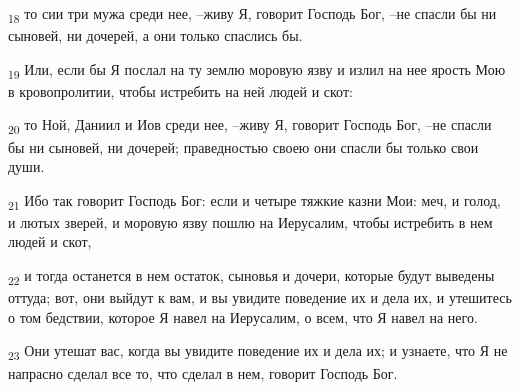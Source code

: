 \begin{tcolorbox}
\textsubscript{18} то сии три мужа среди нее, --живу Я, говорит Господь Бог, --не спасли бы ни сыновей, ни дочерей, а они только спаслись бы.
\end{tcolorbox}
\begin{tcolorbox}
\textsubscript{19} Или, если бы Я послал на ту землю моровую язву и излил на нее ярость Мою в кровопролитии, чтобы истребить на ней людей и скот:
\end{tcolorbox}
\begin{tcolorbox}
\textsubscript{20} то Ной, Даниил и Иов среди нее, --живу Я, говорит Господь Бог, --не спасли бы ни сыновей, ни дочерей; праведностью своею они спасли бы только свои души.
\end{tcolorbox}
\begin{tcolorbox}
\textsubscript{21} Ибо так говорит Господь Бог: если и четыре тяжкие казни Мои: меч, и голод, и лютых зверей, и моровую язву пошлю на Иерусалим, чтобы истребить в нем людей и скот,
\end{tcolorbox}
\begin{tcolorbox}
\textsubscript{22} и тогда останется в нем остаток, сыновья и дочери, которые будут выведены оттуда; вот, они выйдут к вам, и вы увидите поведение их и дела их, и утешитесь о том бедствии, которое Я навел на Иерусалим, о всем, что Я навел на него.
\end{tcolorbox}
\begin{tcolorbox}
\textsubscript{23} Они утешат вас, когда вы увидите поведение их и дела их; и узнаете, что Я не напрасно сделал все то, что сделал в нем, говорит Господь Бог.
\end{tcolorbox}
